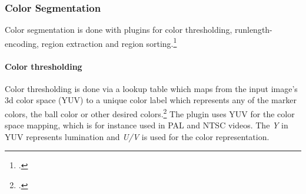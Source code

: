 \subsubsection{Color Segmentation}
Color segmentation is done with plugins for color thresholding, runlength-encoding,
region extraction and region sorting.\footcite[Cf.][]{zickler_ssl_vision}

\paragraph{Color thresholding}
Color thresholding is done via a lookup table which maps from the input image's
3d color space (YUV) to a unique color label which represents any of the marker
colors, the ball color or other desired colors.\footcite[Cf.][p. 4 et sq.]{zickler_ssl_vision}
The plugin uses YUV for the color space mapping, which is for instance used
in PAL and NTSC videos. The \textit{Y} in YUV represents lumination and
\textit{U/V} is used for the color representation.

